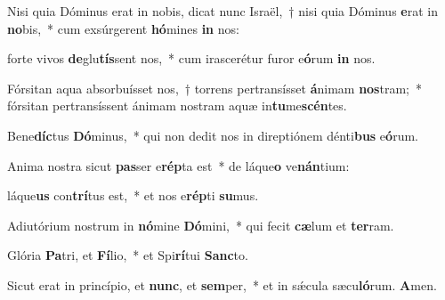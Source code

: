 \item Nisi quia Dóminus erat in nobis, dicat nunc Israël,~† nisi quia Dóminus \textbf{e}rat in \textbf{no}bis,~* cum exsúrgerent \textbf{hó}mines \textbf{in} nos:

\item forte vivos \textbf{de}glu\textbf{tís}sent nos,~* cum irascerétur furor e\textbf{ó}rum \textbf{in} nos.

\item Fórsitan aqua absorbuísset nos,~† torrens pertransísset \textbf{á}nimam \textbf{nos}tram;~* fórsitan pertransíssent ánimam nostram aquæ in\textbf{tu}me\textbf{scén}tes.

\item Bene\textbf{díc}tus \textbf{Dó}minus,~* qui non dedit nos in direptiónem dénti\textbf{bus} e\textbf{ó}rum.

\item Anima nostra sicut \textbf{pas}ser e\textbf{rép}ta est~* de láque\textbf{o} ve\textbf{nán}tium:

\item láque\textbf{us} con\textbf{trí}tus est,~* et nos e\textbf{rép}ti \textbf{su}mus.

\item Adiutórium nostrum in \textbf{nó}mine \textbf{Dó}mini,~* qui fecit \textbf{cæ}lum et \textbf{ter}ram.

\item Glória \textbf{Pa}tri, et \textbf{Fí}lio,~* et Spi\textbf{rí}tui \textbf{Sanc}to.

\item Sicut erat in princípio, et \textbf{nunc}, et \textbf{sem}per,~* et in sǽcula sæcu\textbf{ló}rum. \textbf{A}men.